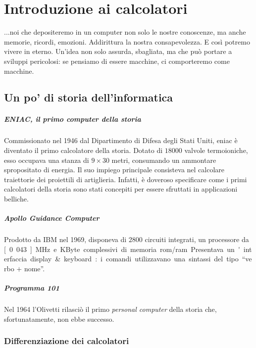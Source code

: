 \documentclass[class=book, crop=false, oneside]{standalone}
\begin{document}
\chapter{Introduzione ai calcolatori}\begin{fquote}...noi che depositeremo in un computer non solo le nostre conoscenze, ma anche memorie, ricordi, emozioni. Addirittura la nostra consapevolezza. E così potremo vivere in eterno. Un'idea non solo assurda, sbagliata, ma che può portare a sviluppi pericolosi: se pensiamo di essere macchine, ci comporteremo come macchine.\end{fquote}

\section{Un po' di storia dell'informatica}

\paragraph{ENIAC, il primo computer della storia}
Commissionato nel 1946 dal Dipartimento di Difesa degli Stati Uniti, \acrfull{eniac} è diventato il primo calcolatore della storia.
Dotato di \(18000\) valvole termoioniche, esso occupava una stanza di \(9 \times 30\) metri, consumando un ammontare spropositato di energia.
Il suo impiego principale consisteva nel calcolare traiettorie dei proiettili di artiglieria.
Infatti, è doveroso specificare come i primi calcolatori della storia sono stati concepiti per essere sfruttati in applicazioni belliche.

\paragraph{Apollo Guidance Computer}
Prodotto da IBM nel 1969, disponeva di \(2800\) circuiti integrati, un processore da \unit[0.043]{MHz} e \unit[152]{KByte} complessivi di memoria \acrshort{rom}/\acrshort{ram}.
Presentava un'interfaccia display \& keyboard: i comandi utilizzavano una sintassi del tipo \enquote{verbo \(+\) nome}.

\paragraph{Programma 101}
Nel 1964 l'Olivetti rilasciò il primo \emph{personal computer} della storia che, sfortunatamente, non ebbe successo.

\subsection{Differenziazione dei calcolatori}
\end{document}
